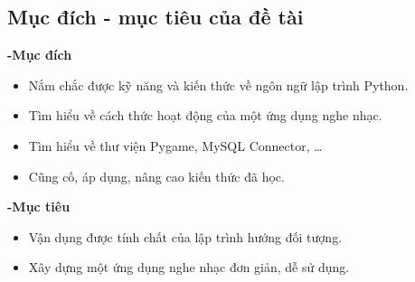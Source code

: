 \documentclass[a4paper]{article}
\begin{document}

\subsection{Mục đích - mục tiêu của đề tài}
\textbf{-Mục đích}
\begin{itemize}
	\item Nắm chắc được kỹ năng và kiến thức về ngôn ngữ lập trình Python.
	\item Tìm hiểu về cách thức hoạt động của một ứng dụng nghe nhạc.
	\item Tìm hiểu về thư viện Pygame, MySQL Connector, \dots
	\item Cũng cố, áp dụng, nâng cao kiến thức đã học.
\end{itemize}
\textbf{-Mục tiêu}
\begin{itemize}
	\item Vận dụng được tính chất của lập trình hướng đối tượng.
	\item Xây dựng một ứng dụng nghe nhạc đơn giản, dễ sử dụng.
\end{itemize}
\end{document}

